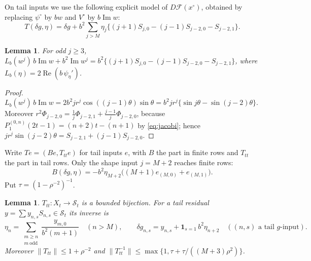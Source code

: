 \documentclass[11pt]{amsart}
\newtheorem{lemma}[theorem]{Lemma}
\theoremstyle{definition}
\theoremstyle{remark}
\numberwithin{equation}{section}
\newcommand{\Sc}{\mathcal{S}}
\newcommand{\Fc}{\mathcal{F}}
\newcommand{\one}{\mathbf{1}}
\DeclareMathOperator{\re}{Re}
\DeclareMathOperator{\im}{Im}
\newcommand{\nrm}[1]{\lVert #1\rVert}
\begin{document}
On tail inputs we use the following explicit model of $D\Fc(x^\circ)$, obtained by replacing $\psi^\circ$ by $bw$ and $V^\circ$ by $b\im w$:
\begin{equation}\label{eq:T}
T(\delta g,\eta)=\delta g+b^2\sum_{j>M}\eta_j\big\{(j+1)S_{j,0}-(j-1)S_{j-2,0}-S_{j-2,1}\big\}.
\end{equation}

\begin{lemma}\label{lem:Tform}
For odd $j\geq3$, $L_b(w^j)\,b\im w+b^2\im w^j=b^2\{(j+1)S_{j,0}-(j-1)S_{j-2,0}-S_{j-2,1}\}$, where $L_b(\eta)=2\re(b\,\psi_\eta')$.
\end{lemma}

\begin{proof}
$L_b(w^j)\,b\im w=2b^2jr^{j}\cos((j-1)\theta)\sin\theta=b^2jr^j\{\sin j\theta-\sin(j-2)\theta\}$. Moreover $r^2\Phi_{j-2,0}=\frac1j\Phi_{j-2,1}+\frac{j-1}j\Phi_{j-2,0}$, because $P^{(0,n)}_1(2t-1)=(n+2)t-(n+1)$ by \eqref{eq:jacobi}; hence $jr^j\sin(j-2)\theta=S_{j-2,1}+(j-1)S_{j-2,0}$.
\end{proof}

Write $Te=(Be,T_{tt}e)$ for tail inputs $e$, with $B$ the part in finite rows and $T_{tt}$ the part in tail rows. Only the shape input $j=M+2$ reaches finite rows:
\begin{equation}\label{eq:B}
B(\delta g,\eta)=-b^2\eta_{M+2}\big((M+1)e_{(M,0)}+e_{(M,1)}\big).
\end{equation}
Put $\tau=(1-\rho^{-2})^{-1}$.

\begin{lemma}\label{lem:Ttt}
$T_{tt}\colon X_t\to\Sc_t$ is a bounded bijection. For a tail residual $y=\sum y_{n,s}S_{n,s}\in\Sc_t$ its inverse is
\begin{equation}\label{eq:Tinv}
\eta_n=\sum_{\substack{m\geq n\\ m\ \mathrm{odd}}}\frac{y_{m,0}}{b^2(m+1)}\quad(n>M),\qquad \delta g_{n,s}=y_{n,s}+\one_{s=1}\,b^2\eta_{n+2}\quad((n,s)\text{ a tail $g$-input}).
\end{equation}
Moreover $\nrm{T_{tt}}\leq1+\rho^{-2}$ and $\nrm{T_{tt}^{-1}}\leq\max\{1,\tau+\tau/((M+3)\rho^2)\}$.
\end{lemma}
\end{document}
